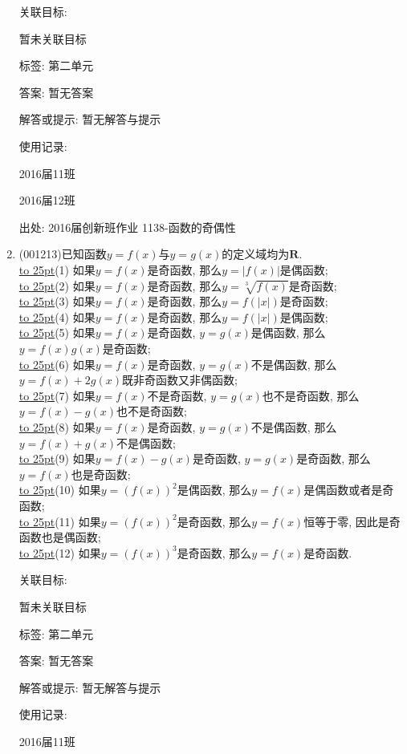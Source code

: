 \documentclass[10pt,a4paper]{article}
\newcommand{\blank}[1]{\underline{\hbox to #1pt{}}}
\begin{document}
\begin{enumerate}[1.]
关联目标:

暂未关联目标



标签: 第二单元

答案: 暂无答案

解答或提示: 暂无解答与提示

使用记录:

2016届11班	

2016届12班	


出处: 2016届创新班作业	1138-函数的奇偶性
\item { (001213)}已知函数$y=f(x)$与$y=g(x)$的定义域均为$\mathbf{R}$.\\ 
\blank{25}(1) 如果$y=f(x)$是奇函数, 那么$y=|f(x)|$是偶函数;\\ 
\blank{25}(2) 如果$y=f(x)$是奇函数, 那么$y=\sqrt[3]{f(x)}$是奇函数;\\ 
\blank{25}(3) 如果$y=f(x)$是奇函数, 那么$y=f(|x|)$是奇函数;\\ 
\blank{25}(4) 如果$y=f(x)$是奇函数, 那么$y=f(|x|)$是偶函数;\\ 
\blank{25}(5) 如果$y=f(x)$是奇函数, $y=g(x)$是偶函数, 那么$y=f(x)g(x)$是奇函数;\\ 
\blank{25}(6) 如果$y=f(x)$是奇函数, $y=g(x)$不是偶函数, 那么$y=f(x)+2g(x)$既非奇函数又非偶函数;\\ 
\blank{25}(7) 如果$y=f(x)$不是奇函数, $y=g(x)$也不是奇函数, 那么$y=f(x)-g(x)$也不是奇函数;\\ 
\blank{25}(8) 如果$y=f(x)$是奇函数, $y=g(x)$不是偶函数, 那么$y=f(x)+g(x)$不是偶函数;\\ 
\blank{25}(9) 如果$y=f(x)-g(x)$是奇函数, $y=g(x)$是奇函数, 那么$y=f(x)$也是奇函数;\\ 
\blank{25}(10) 如果$y=(f(x))^2$是偶函数, 那么$y=f(x)$是偶函数或者是奇函数;\\ 
\blank{25}(11) 如果$y=(f(x))^2$是奇函数, 那么$y=f(x)$恒等于零, 因此是奇函数也是偶函数;\\ 
\blank{25}(12) 如果$y=(f(x))^3$是奇函数, 那么$y=f(x)$是奇函数.


关联目标:

暂未关联目标



标签: 第二单元

答案: 暂无答案

解答或提示: 暂无解答与提示

使用记录:

2016届11班												


\end{enumerate}
\end{document}
